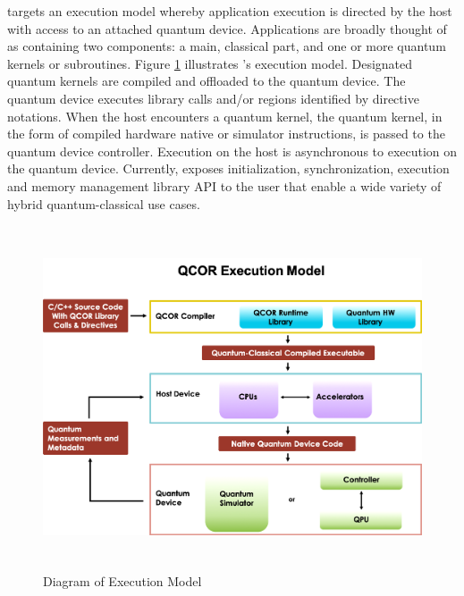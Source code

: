 \qcor targets an execution model whereby application execution is directed by the host with access to an attached quantum device. Applications are broadly thought of as containing two components: a main, classical part, and one or more quantum kernels or subroutines. Figure \ref{fig:exec_model} illustrates \qcor's execution model. Designated quantum kernels are compiled and offloaded to the quantum device. The quantum device executes \qcor library calls and/or \qcor regions identified by directive notations. When the host encounters a quantum kernel, the quantum kernel, in the form of compiled hardware native or simulator 
instructions, is passed to the quantum device controller. Execution on the host is asynchronous to execution on the quantum device. 
Currently, \qcor exposes initialization, synchronization, execution and memory management library \ac{API} to the user that enable a wide variety of hybrid quantum-classical use cases.

\begin{figure}
 \centering
 \includegraphics[width=5in,height=4in]{figures/Execution_Model_Illustration_v3.png}
  \caption{Diagram of \qcor Execution Model}
  \label{fig:exec_model}
\end{figure}

